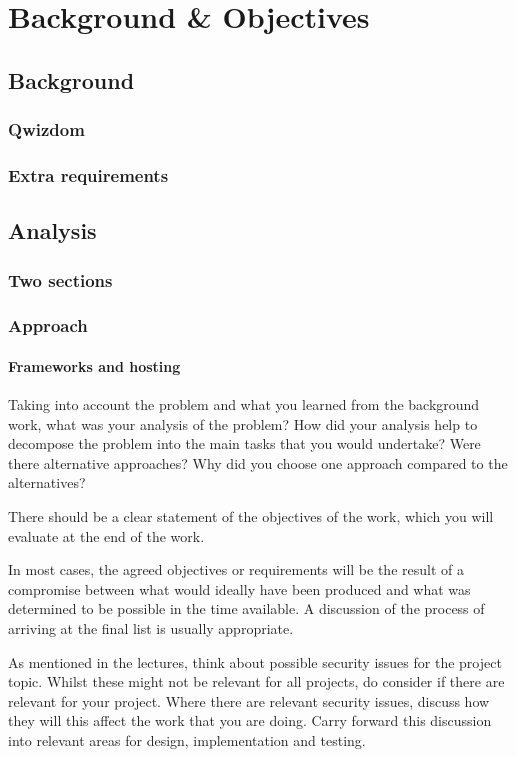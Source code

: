 \chapter{Background \& Objectives}
\section{Background}
\subsection{Qwizdom}
\subsection{Extra requirements}

\section{Analysis}
\subsection{Two sections}
\subsection{Approach}
\subsubsection{Frameworks and hosting}
Taking into account the problem and what you learned from the background work, what was your analysis of the problem? How did your analysis help to decompose the problem into the main tasks that you would undertake? Were there alternative approaches? Why did you choose one approach compared to the alternatives? 

There should be a clear statement of the objectives of the work, which you will evaluate at the end of the work. 

In most cases, the agreed objectives or requirements will be the result of a compromise between what would ideally have been produced and what was determined to be possible in the time available. A discussion of the process of arriving at the final list is usually appropriate.

As mentioned in the lectures, think about possible security issues for the project topic. Whilst these might not be relevant for all projects, do consider if there are relevant for your project. Where there are relevant security issues, discuss how they will this affect the work that you are doing. Carry forward this discussion into relevant areas for design, implementation and testing.

